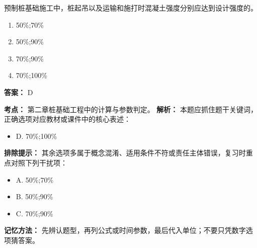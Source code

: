 \documentclass[UTF8,fontset=fandol,11pt]{ctexart}
\begin{document}
\begin{quizbox}[title={第 1 题}]
预制桩基础施工中，桩起吊以及运输和施打时混凝土强度分别应达到设计强度的。\\
\begin{enumerate}[label=\Alph*.]
\item 50\%;70\%
\item 50\%;90\%
\item 70\%;90\%
\item 70\%;100\%
\end{enumerate}
\textbf{答案：} D
\vspace{0.25em}
\begin{answerbox}[title={考点解析}]
\textbf{考点：} 第二章桩基础工程中的计算与参数判定。
\textbf{解析：} 本题应抓住题干关键词，正确选项对应教材或课件中的核心表述：
\begin{itemize}
\item D. 70\%;100\%
\end{itemize}
\textbf{排除提示：} 其余选项多属于概念混淆、适用条件不符或责任主体错误，复习时重点对照下列干扰项：
\begin{itemize}
\item A. 50\%;70\%
\item B. 50\%;90\%
\item C. 70\%;90\%
\end{itemize}
\textbf{记忆方法：} 先辨认题型，再列公式或时间参数，最后代入单位；不要只凭数字选项猜答案。
\end{answerbox}
\end{quizbox}

\vspace{0.2em}
\end{document}
